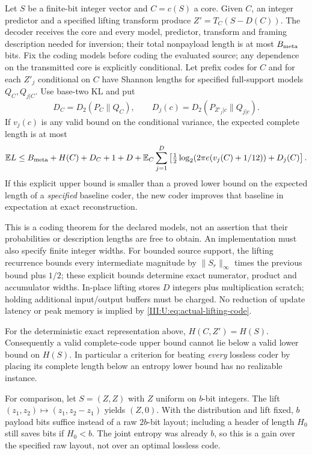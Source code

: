 \begin{theorem}
\label{III:U:thm:actual-lifting-code}
Let $S$ be a finite-bit integer vector and $C=c(S)$ a core. Given $C$,
an integer predictor and a specified lifting transform produce
$Z'=T_C(S-D(C))$. The decoder receives the core and every model,
predictor, transform and framing description needed for inversion;
their total nonpayload length is at most $B_{\rm meta}$ bits.
Fix the coding models before coding the evaluated source; any dependence
on the transmitted core is explicitly conditional. Let prefix codes
for $C$ and for each $Z'_j$ conditional on $C$ have
Shannon lengths for specified full-support models $Q_C,Q_{j|C}$.
Use base-two KL and put
\[
 D_C=D_2(P_C\|Q_C),\qquad
 D_j(c)=D_2(P_{Z'_j|c}\|Q_{j|c}).
\]
If $v_j(c)$ is any valid bound on the conditional variance, the
expected complete length is at most
\begin{align}
 \mathbb E L\le B_{\rm meta}+H(C)+D_C+1+D
 +\mathbb E_C\sum_{j=1}^D\left[
 \tfrac12\log_2(2\pi e(v_j(C)+1/12))+D_j(C)\right].
 \label{III:U:eq:actual-lifting-code}
\end{align}
If this explicit upper bound is smaller than a proved lower bound
on the expected length of a \emph{specified} baseline coder, the new
coder improves that baseline in expectation at exact reconstruction.
\end{theorem}

This is a coding theorem for the declared models, not an assertion
that their probabilities or description lengths are free to obtain.
An implementation must also specify finite integer widths. For
bounded source support, the lifting recurrence bounds every intermediate
magnitude by $\|S_r\|_\infty$ times the previous bound plus $1/2$;
these explicit bounds determine exact numerator, product and accumulator
widths. In-place lifting stores $D$ integers plus multiplication scratch;
holding additional input/output buffers must be charged. No reduction
of update latency or peak memory is implied by \eqref{III:U:eq:actual-lifting-code}.

\begin{proposition}
\label{III:U:prop:no-universal-code-gain}
For the deterministic exact representation above,
$H(C,Z')=H(S)$. Consequently a valid complete-code upper bound cannot
lie below a valid lower bound on $H(S)$. In particular a
criterion for beating \emph{every} lossless coder by placing its
complete length below an entropy lower bound has no realizable instance.
\end{proposition}

For comparison, let $S=(Z,Z)$ with $Z$ uniform on $b$-bit integers.
The lift $(z_1,z_2)\mapsto(z_1,z_2-z_1)$ yields $(Z,0)$.
With the distribution and lift fixed, $b$ payload bits suffice instead
of a raw $2b$-bit layout; including a header of length $H_0$ still
saves bits if $H_0<b$. The joint entropy was already $b$, so this is
a gain over the specified raw layout, not over an optimal lossless code.

